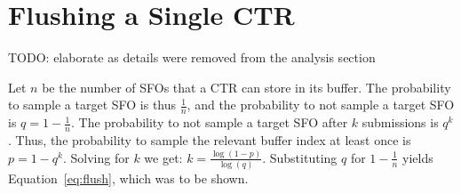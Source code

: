 \section{Flushing a Single CTR} \label{app:flush}
TODO: elaborate as details were removed from the analysis section
%

Let $n$ be the number of SFOs that a CTR can store in its buffer.  The
probability to sample a target SFO is thus $\frac{1}{n}$, and the probability to
not sample a target SFO is $q = 1 - \frac{1}{n}$.  The probability to not sample
a target SFO after $k$ submissions is $q^k$.  Thus, the probability to sample
the relevant buffer index at least once is $p = 1 - q^k$.  Solving for $k$ we
get: $k = \frac{\log(1 - p)}{\log(q)}$.  Substituting $q$ for $1 - \frac{1}{n}$
yields Equation~\ref{eq:flush}, which was to be shown.
